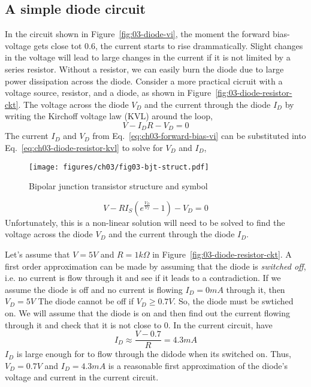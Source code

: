 \subsection{A simple diode circuit}
In the circuit shown in Figure~\ref{fig:03-diode-vi}, the moment the forward bias-voltage gets close tot 0.6, the current starts to rise drammatically. Slight changes in the voltage will lead to large changes in the current if it is not limited by a series resistor. Without a resistor, we can easily burn the diode due to large power dissipation across the diode. Consider a more practical cicruit with a voltage source, resistor, and a diode, as shown in Figure~\ref{fig:03-diode-resistor-ckt}. The voltage across the diode $V_D$ and the current through the diode $I_D$ by writing the Kirchoff voltage law (KVL) around the loop,
\begin{equation}
    V - I_D R - V_D = 0
    \label{eq:ch03-diode-resistor-kvl}
\end{equation}
The current $I_D$ and $V_D$ from Eq.~\ref{eq:ch03-forward-bias-vi} can be substituted into Eq.~\ref{eq:ch03-diode-resistor-kvl} to solve for $V_D$ and $I_D$,
\begin{figure}[t]
    \centering
    \texttt{[image: figures/ch03/fig03-bjt-struct.pdf]}
    \caption{Bipolar junction transistor structure and symbol}
    \label{fig:03-04}
\end{figure}
\begin{equation}
    V - R I_S \left( e^{\frac{V_D}{V_T}} - 1 \right) - V_D = 0
    \label{eq:ch03-diode-resistor-vd-id}
\end{equation}
Unfortunately, this is a non-linear solution will need to be solved to find the voltage across the diode $V_D$ and the current through the diode $I_D$. 

Let's assume that $V=5V$ and $R=1k\Omega$ in Figure~\ref{fig:03-diode-resistor-ckt}. A first order approximation can be made by assuming that the diode is \textit{switched off}, i.e. no current is flow through it and see if it leads to a contradiction. If we assume the diode is off and no current is flowing $I_D = 0mA$ through it, then $V_D = 5V$ The diode cannot be off if $V_D \geq 0.7V$. So, the diode must be swtiched on. We will assume that the diode is on and then find out the current flowing through it and check that it is not close to 0. In the current circuit, have 
\begin{equation}
    I_D \approx \frac{V - 0.7}{R} = 4.3mA
    \label{eq:ch03-diode-resistor-id-approx}
\end{equation}
$I_D$ is large enough for to flow through the didode when its switched on. Thus, $V_D=0.7V$ and $I_D=4.3mA$ is a reasonable first approximation of the diode's voltage and current in the current circuit.

